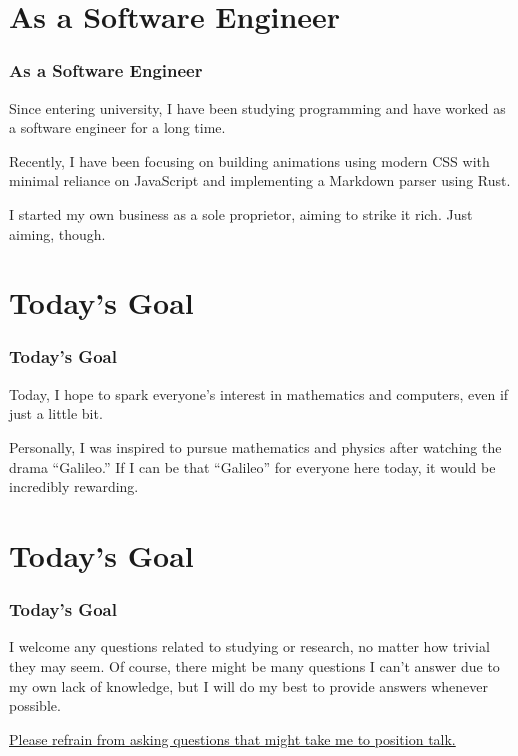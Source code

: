 \documentclass[dvipdfmx,11pt,notheorems]{beamer}
\begin{document}
\section{As a Software Engineer}
\begin{frame}\frametitle{As a Software Engineer}
  Since entering university, I have been studying programming and have worked as a software engineer for a long time.

  Recently, I have been focusing on building animations using modern CSS with minimal reliance on JavaScript and implementing a Markdown parser using Rust.

  I started my own business as a sole proprietor, aiming to strike it rich. Just aiming, though.
\end{frame}

\section{Today's Goal}
\begin{frame}\frametitle{Today's Goal}
  Today, I hope to spark everyone's interest in mathematics and computers, even if just a little bit.

  Personally, I was inspired to pursue mathematics and physics after watching the drama ``Galileo.'' If I can be that ``Galileo'' for everyone here today, it would be incredibly rewarding.
\end{frame}

\section{Today's Goal}
\begin{frame}\frametitle{Today's Goal}
  I welcome any questions related to studying or research, no matter how trivial they may seem. Of course, there might be many questions I can't answer due to my own lack of knowledge, but I will do my best to provide answers whenever possible.

  \alert{\underline{Please refrain from asking questions that might take me to position talk.}}
\end{frame}
\end{document}
